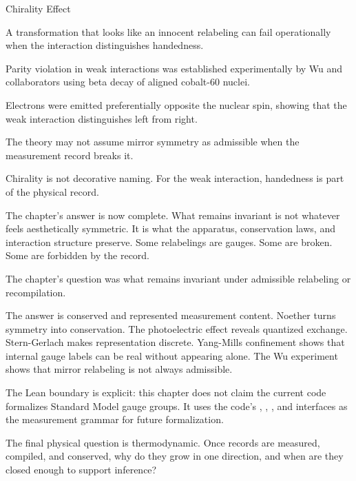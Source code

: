 \begin{phenom}{Chirality Effect}
\label{ph:chirality-effect}

\PhStatement A transformation that looks like an innocent relabeling can fail
operationally when the interaction distinguishes handedness.

\PhOrigin Parity violation in weak interactions was established experimentally
by Wu and collaborators using beta decay of aligned cobalt-60 nuclei.

\PhObservation Electrons were emitted preferentially opposite the nuclear spin,
showing that the weak interaction distinguishes left from right.

\PhConstraint The theory may not assume mirror symmetry as admissible when the
measurement record breaks it.

\PhConsequence Chirality is not decorative naming. For the weak interaction,
handedness is part of the physical record.

\end{phenom}

The chapter's answer is now complete. What remains invariant is not whatever
feels aesthetically symmetric. It is what the apparatus, conservation laws, and
interaction structure preserve. Some relabelings are gauges. Some are broken.
Some are forbidden by the record.

\begin{bridge}

The chapter's question was what remains invariant under admissible relabeling
or recompilation.

The answer is conserved and represented measurement content. Noether turns
symmetry into conservation. The photoelectric effect reveals quantized exchange.
Stern-Gerlach makes representation discrete. Yang-Mills confinement shows that
internal gauge labels can be real without appearing alone. The Wu experiment
shows that mirror relabeling is not always admissible.

The Lean boundary is explicit: this chapter does not claim the current code
formalizes Standard Model gauge groups. It uses the code's ,
, , and  interfaces as the
measurement grammar for future formalization.

The final physical question is thermodynamic. Once records are measured,
compiled, and conserved, why do they grow in one direction, and when are they
closed enough to support inference?

\end{bridge}


